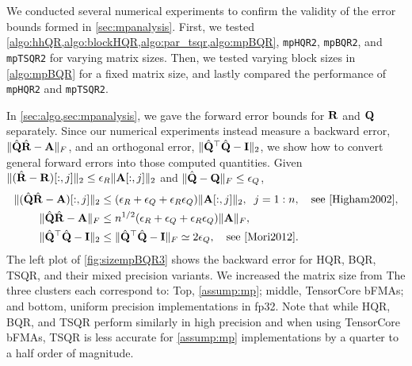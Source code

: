 We conducted several numerical experiments to confirm the validity of the error bounds formed in \cref{sec:mpanalysis}.
First, we tested \cref{algo:hhQR,algo:blockHQR,algo:par_tsqr,algo:mpBQR}, {\tt mpHQR2}, {\tt mpBQR2}, and {\tt mpTSQR2} for varying matrix sizes.
Then, we tested varying block sizes in \cref{algo:mpBQR} for a fixed matrix size, and lastly compared the performance of {\tt mpHQR2} and {\tt mpTSQR2}.\par

In \cref{sec:algo,sec:mpanalysis}, we gave the forward error bounds for $\mathbf{R}$ and $\mathbf{Q}$ separately. 
Since our numerical experiments instead measure a backward error, $\|\hat{\mathbf{Q}}\hat{\mathbf{R}}-\mathbf{A}\|_F$, and an orthogonal error, $\|\hat{\mathbf{Q}}^{\top}\hat{\mathbf{Q}}-\mathbf{I}\|_2$, we show how to convert general forward errors into those computed quantities.
Given $\|(\hat{\mathbf{R}}-\mathbf{R})[:,j]\|_2\leq \epsilon_R \|\mathbf{A}[:,j]\|_2$ and $\|\hat{\mathbf{Q}}-\mathbf{Q}\|_F\leq \epsilon_Q$,
\begin{align}
	\|(\hat{\bb{Q}}\hat{\bb{R}}-\bb{A})[:,j]\|_2 &\leq (\epsilon_R+\epsilon_Q + \epsilon_R\epsilon_Q)\|\bb{A}[:,j]\|_2,\;\; j=1:n,\quad \text{see \cite{Higham2002}},\\
	\|\hat{\bb{Q}}\hat{\bb{R}}-\bb{A}\|_F &\leq n^{1/2}(\epsilon_R+\epsilon_Q + \epsilon_R\epsilon_Q)\|\bb{A}\|_F, \label{eqn:QRA} \\
	\|\hat{\bb{Q}}^{\top}\hat{\bb{Q}}-\bb{I}\|_2 &\leq \|\hat{\bb{Q}}^{\top}\hat{\bb{Q}}-\bb{I}\|_F \simeq 2\epsilon_Q,\quad\text{see \cite{Mori2012}} \label{eqn:QQI}.
\end{align}
The left plot of \cref{fig:sizempBQR3} shows the backward error for HQR, BQR, TSQR, and their mixed precision variants.
We increased the matrix size from 
The three clusters each correspond to: Top, \cref{assump:mp}; middle, TensorCore bFMAs; and bottom, uniform precision implementations in fp32.
Note that while HQR, BQR, and TSQR perform similarly in high precision and when using TensorCore bFMAs, TSQR is less accurate for \cref{assump:mp} implementations by a quarter to a half order of magnitude.


